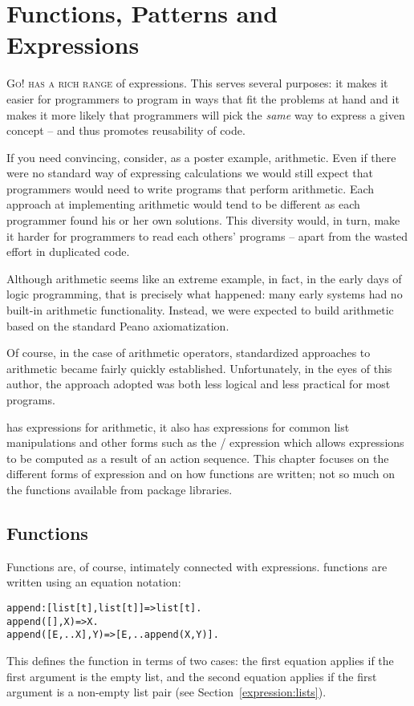 \chapter{Functions, Patterns and Expressions}
\label{expressions}
\lettrine[nindent=0.1em]{G}{o! has a rich range} of expressions. This serves several purposes: it makes it easier for programmers to program in ways that fit the problems at hand and it makes it more likely that programmers will pick the \emph{same} way to express a given concept -- and thus promotes reusability of code.

\begin{aside}
If you need convincing, consider, as a poster example, arithmetic. Even if there were no standard way of expressing calculations we would still expect that programmers would need to write programs that perform arithmetic.   Each approach at implementing arithmetic would tend to be different as each programmer found his or her own solutions. This diversity would, in turn, make it harder for programmers to read each others' programs -- apart from the wasted effort in duplicated code.

Although arithmetic seems like an extreme example, in fact, in the early days of logic programming, that is precisely what happened: many early systems had no built-in arithmetic functionality. Instead, we were expected to build arithmetic based on the standard Peano axiomatization.

Of course, in the case of arithmetic operators, standardized approaches to arithmetic became fairly quickly established. Unfortunately, in the eyes of this author, the approach adopted was both less logical and less practical for most programs.
\end{aside}

\go has expressions for arithmetic, it also has expressions for common list manipulations and other forms such as the / expression which allows expressions to be computed as a result of an action sequence. This chapter focuses on the different forms of expression and on how functions are written; not so much on the functions available from package libraries.

\section{Functions}
\label{expression:function}
Functions are, of course, intimately connected with expressions. \go functions are written using an equation notation:
\begin{alltt}
append:[list[t],list[t]]=>list[t].
append([],X) => X.
append([E,..X],Y) => [E,..append(X,Y)].
\end{alltt}
This defines the  function in terms of two cases: the first equation applies if the first argument is the empty list, and the second equation applies if the first argument is a non-empty list pair (see Section~\vref{expression:lists}).

